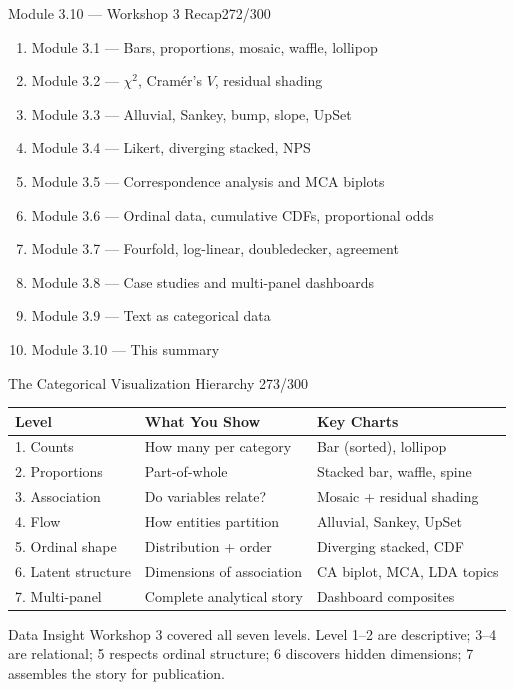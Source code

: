 \documentclass[10pt]{beamer}
\newcommand{\smark}[1]{\hfill{\scriptsize\color{codegray}#1}}
\begin{document}
\begin{frame}{Module 3.10 --- Workshop 3 Recap}\smark{272/300}
\begin{enumerate}
    \item Module 3.1 --- Bars, proportions, mosaic, waffle, lollipop
    \item Module 3.2 --- $\chi^2$, Cram\'er's $V$, residual shading
    \item Module 3.3 --- Alluvial, Sankey, bump, slope, UpSet
    \item Module 3.4 --- Likert, diverging stacked, NPS
    \item Module 3.5 --- Correspondence analysis and MCA biplots
    \item Module 3.6 --- Ordinal data, cumulative CDFs, proportional odds
    \item Module 3.7 --- Fourfold, log-linear, doubledecker, agreement
    \item Module 3.8 --- Case studies and multi-panel dashboards
    \item Module 3.9 --- Text as categorical data
    \item Module 3.10 --- This summary
\end{enumerate}
\end{frame}

\begin{frame}{The Categorical Visualization Hierarchy}
\smark{273/300}
\centering\small
\begin{tabular}{@{}lll@{}}
    \toprule
    \textbf{Level} & \textbf{What You Show} & \textbf{Key Charts} \\
    \midrule
    1. Counts           & How many per category      & Bar (sorted), lollipop \\
    2. Proportions      & Part-of-whole              & Stacked bar, waffle, spine \\
    3. Association      & Do variables relate?       & Mosaic + residual shading \\
    4. Flow             & How entities partition      & Alluvial, Sankey, UpSet \\
    5. Ordinal shape    & Distribution + order        & Diverging stacked, CDF \\
    6. Latent structure & Dimensions of association   & CA biplot, MCA, LDA topics \\
    7. Multi-panel      & Complete analytical story   & Dashboard composites \\
    \bottomrule
\end{tabular}

\vspace{0.3cm}
\begin{exampleblock}{Data Insight}
    \scriptsize Workshop 3 covered all seven levels. Level 1--2 are descriptive; 3--4 are relational; 5 respects ordinal structure; 6 discovers hidden dimensions; 7 assembles the story for publication.
\end{exampleblock}
\end{frame}
\end{document}
